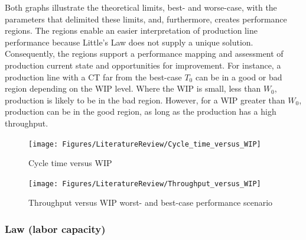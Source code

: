 \documentclass{article}
\begin{document}
Both graphs illustrate the theoretical limits, best- and worse-case, with the parameters that delimited these limits, and, furthermore, creates performance regions.
The regions enable an easier interpretation of production line performance because Little's Law does not supply a unique solution.
Consequently, the regions support a performance mapping and assessment of production current state and opportunities for improvement.
For instance, a production line with a CT far from the best-case \(T_0\) can be in a good or bad region depending on the WIP level.
Where the WIP is small, less than \(W_0\), production is likely to be in the bad region.
However, for a WIP greater than \(W_0\), production can be in the good region, as long as the production has a high throughput.

\begin{figure}[H]
  \centering
  \texttt{[image: Figures/LiteratureReview/Cycle\_time\_versus\_WIP]}
  \caption{Cycle time versus WIP}\label{fig:Cycle time versus WIP}
\end{figure}

\begin{figure}[H]
  \centering
  \texttt{[image: Figures/LiteratureReview/Throughput\_versus\_WIP]}
  \caption{Throughput versus WIP worst- and best-case performance scenario}\label{fig:throughput versus WIP worst- and best-case performance scenario}
\end{figure}

\subsubsection{Law (labor capacity)}
\label{sec:org23f0585}
\end{document}
